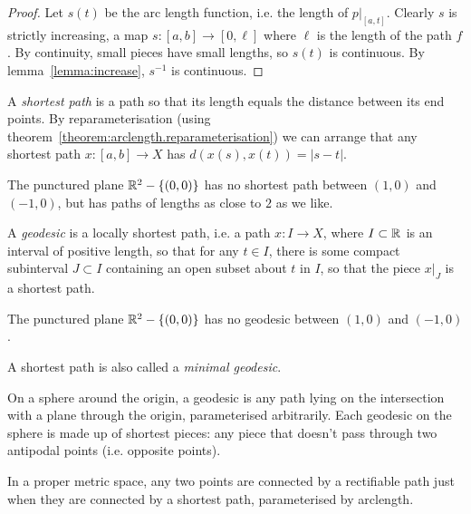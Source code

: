 \begin{proof}
Let \(s(t)\) be the arc length function, i.e. the length of \(\left.p\right|_{[a,t]}\).
Clearly \(s\) is strictly increasing, a map \(s \colon [a,b] \to [0,\ell]\) where \(\ell\) is the length of the path \(f\).
By continuity, small pieces have small lengths, so \(s(t)\) is continuous.
By lemma~\vref{lemma:increase}, \(s^{-1}\) is continuous.
\end{proof}
A \emph{shortest path} is a path so that its length equals the distance between its end points.
By reparameterisation (using theorem~\vref{theorem:arclength.reparameterisation}) we can arrange that any shortest path \(x \colon [a,b] \to X\) has \(d(x(s),x(t))=|s-t|\).
\begin{example}
The punctured plane \(\mathbb{R}^{2}-\left\{(0,0)\right\}\) has no shortest path between \((1,0)\) and \((-1,0)\), but has paths of lengths as close to \(2\) as we like.
\end{example}
A \emph{geodesic} is a locally shortest path, i.e. a path \(x \colon I \to X\), where \(I \subset \mathbb{R}^{}\) is an interval of positive length, so that for any \(t \in I\), there is some compact subinterval \(J \subset I\) containing an open subset about \(t\) in \(I\), so that the piece \(\left.x\right|_J\) is a shortest path.
\begin{example}
The punctured plane \(\mathbb{R}^{2}-\left\{(0,0)\right\}\) has no geodesic between \((1,0)\) and \((-1,0)\).
\end{example}
A shortest path is also called a \emph{minimal geodesic}.
\begin{example}
On a sphere around the origin, a geodesic is any path lying on the intersection with a plane through the origin, parameterised arbitrarily.
Each geodesic on the sphere is made up of shortest pieces: any piece that doesn't pass through two antipodal points (i.e. opposite points).
\end{example}
\begin{theorem}\label{theorem:exists.shortest}
In a proper metric space, any two points are connected by a rectifiable path just when they are connected by a shortest path, parameterised by arclength.
\end{theorem}
